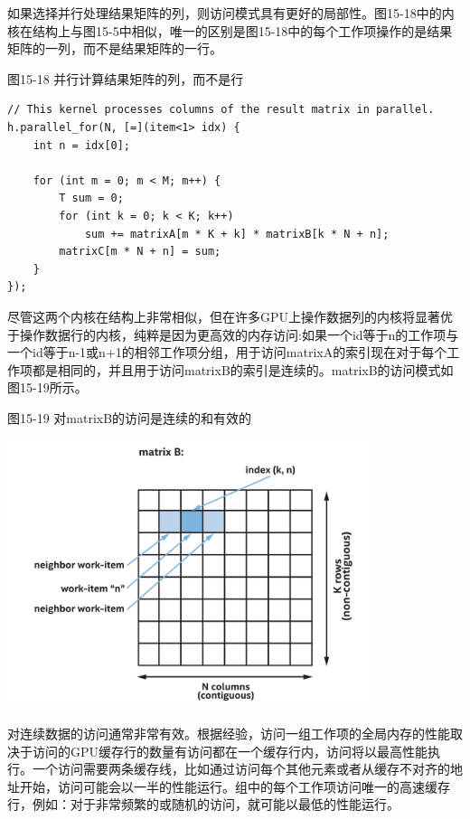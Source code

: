 如果选择并行处理结果矩阵的列，则访问模式具有更好的局部性。图15-18中的内核在结构上与图15-5中相似，唯一的区别是图15-18中的每个工作项操作的是结果矩阵的一列，而不是结果矩阵的一行。\par

\hspace*{\fill} \par %
图15-18 并行计算结果矩阵的列，而不是行
\begin{lstlisting}[caption={}]
// This kernel processes columns of the result matrix in parallel.
h.parallel_for(N, [=](item<1> idx) {
	int n = idx[0];
	
	for (int m = 0; m < M; m++) {
		T sum = 0;
		for (int k = 0; k < K; k++)
			sum += matrixA[m * K + k] * matrixB[k * N + n];
		matrixC[m * N + n] = sum;
	}
});
\end{lstlisting}

尽管这两个内核在结构上非常相似，但在许多GPU上操作数据列的内核将显著优于操作数据行的内核，纯粹是因为更高效的内存访问:如果一个id等于n的工作项与一个id等于n-1或n+1的相邻工作项分组，用于访问matrixA的索引现在对于每个工作项都是相同的，并且用于访问matrixB的索引是连续的。matrixB的访问模式如图15-19所示。\par

\hspace*{\fill} \par %
图15-19 对matrixB的访问是连续的和有效的
\begin{center}
	\includegraphics[width=0.8\textwidth]{content/chapter-15/images/14}
\end{center}

对连续数据的访问通常非常有效。根据经验，访问一组工作项的全局内存的性能取决于访问的GPU缓存行的数量有访问都在一个缓存行内，访问将以最高性能执行。一个访问需要两条缓存线，比如通过访问每个其他元素或者从缓存不对齐的地址开始，访问可能会以一半的性能运行。组中的每个工作项访问唯一的高速缓存行，例如：对于非常频繁的或随机的访问，就可能以最低的性能运行。\par

